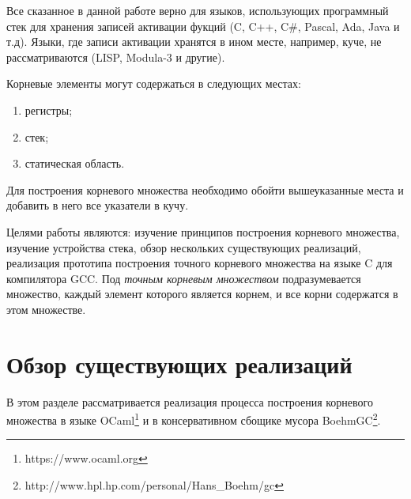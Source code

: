 Все сказанное в данной работе верно для языков, использующих программный стек для хранения записей активации фукций (C, C++, C\#, Pascal, Ada, Java и т.д).
Языки, где записи активации хранятся в ином месте, например, куче, не рассматриваются (LISP, Modula-3 и другие).

Корневые элементы могут содержаться в следующих местах:
\begin{enumerate}
\item регистры;
\item стек;
\item статическая область.
\end{enumerate}

Для построения корневого множества необходимо обойти вышеуказанные места и добавить в него все указатели в кучу.

Целями работы являются: изучение принципов построения корневого множества, изучение устройства стека, обзор нескольких существующих реализаций, 
реализация прототипа построения точного корневого множества на языке C для компилятора GCC. Под \emph{точным корневым множеством} подразумевается множество, 
каждый элемент которого является корнем, и все корни содержатся в этом множестве.

\section{Обзор существующих реализаций}

В этом разделе рассматривается реализация процесса построения корневого множества в языке OCaml\footnote{https://www.ocaml.org} и в 
консервативном сбощике мусора BoehmGC\footnote{http://www.hpl.hp.com/personal/Hans\_Boehm/gc}.

